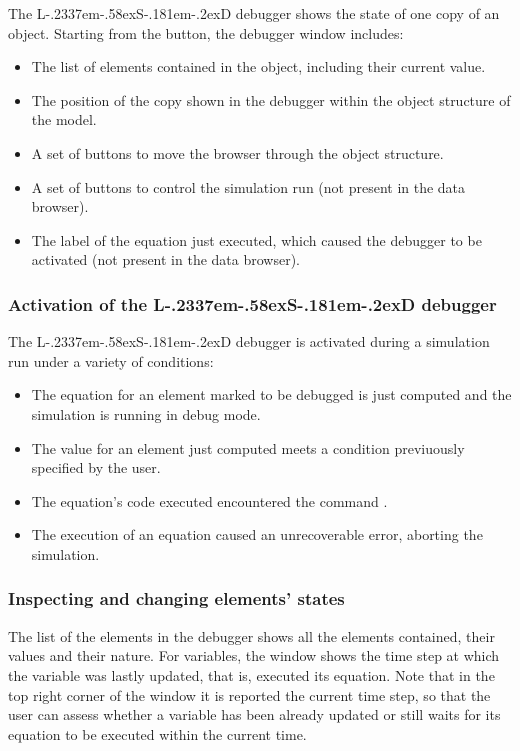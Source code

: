 \documentclass [11pt,a4paper] {book}
\def\LsD{{L\kern-.2337em\lower-.58ex\hbox{S}\kern-.181em\lower-.2ex\hbox{D}}\xspace}
\begin{document}
The \LsD debugger shows the state of one copy of an object. Starting from the button, the debugger window includes: 

\begin{itemize}
	\item The list of elements contained in the object, including their current value.
	\item The position of the copy shown in the debugger within the object structure of the model.
	\item A set of buttons to move the browser through the object structure.
	\item A set of buttons to control the simulation run (not present in the data browser).
	\item The label of the equation just executed, which caused the debugger to be activated (not present in the data browser).
\end{itemize}

\subsubsection{Activation of the \LsD debugger}

The \LsD debugger is activated during a simulation run under a variety of conditions:
\begin{itemize}
	\item The equation for an element marked to be debugged is just computed and the simulation is running in debug mode.
	\item The value for an element just computed meets a condition previuously specified by the user.
	\item The equation's code executed encountered the command .
	\item The execution of an equation caused an unrecoverable error, aborting the simulation.
\end{itemize}

\subsubsection{Inspecting and changing elements' states}
The list of the elements in the debugger shows all the elements contained, their values and their nature. For variables, the window shows the time step at which the variable was lastly updated, that is, executed its equation. Note that in the top right corner of the window it is reported the current time step, so that the user can assess whether a variable has been already updated or still waits for its equation to be executed within the current time.
\end{document}

